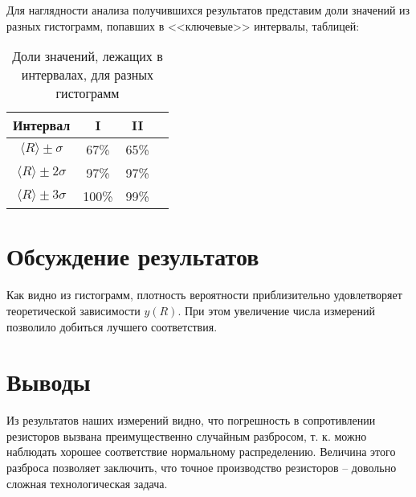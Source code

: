 \documentclass[12pt]{article}
\begin{document}
    Для наглядности анализа получившихся
    результатов представим доли значений из
    разных гистограмм, попавших в <<ключевые>> интервалы,
    таблицей:
    \begin{table}[H]
    \caption{Доли значений, лежащих в интервалах, для разных гистограмм}
    \begin{tabular}{|c|c|c|c|}
        \hline
        Интервал                       & I  & II \\ \hline
        $\langle R\rangle \pm \sigma$   & 67\%  & 65\% \\ \hline
        $\langle R \rangle \pm 2\sigma$ & 97\%  & 97\% \\ \hline
        $\langle R \rangle \pm 3\sigma$ & 100\% & 99\% \\ \hline
        \end{tabular}
    \end{table}

    \section{Обсуждение результатов}
    Как видно из гистограмм, плотность вероятности приблизительно удовлетворяет
    теоретической зависимости $y(R)$. При этом увеличение числа измерений
    позволило добиться лучшего соответствия.

    \section{Выводы}
    Из результатов наших измерений видно, что погрешность в сопротивлении
    резисторов вызвана преимущественно случайным разбросом, т. к. можно
    наблюдать хорошее соответствие нормальному распределению. Величина этого
    разброса позволяет заключить, что точное производство резисторов -- довольно
    сложная технологическая задача.
\end{document}
